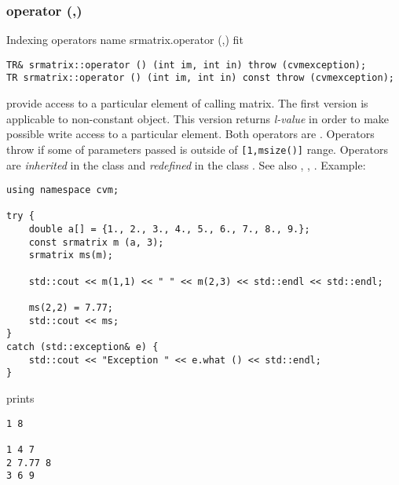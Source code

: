\subsubsection{operator (,)}
Indexing operators%
\pdfdest name {srmatrix.operator (,)} fit
\begin{verbatim}
TR& srmatrix::operator () (int im, int in) throw (cvmexception);
TR srmatrix::operator () (int im, int in) const throw (cvmexception);
\end{verbatim}
provide access to a particular element of calling matrix. The first version
is applicable to non-constant object.
This version returns  \emph{l-value}
in order to make possible write access to a particular element.
Both operators are \Based.
Operators throw 
if some of parameters passed
is outside of \verb"[1,msize()]" range.
Operators are \emph{inherited}
in the class
and \emph{redefined}
in the class .
See also ,
,
.
Example:
\begin{Verbatim}
using namespace cvm;

try {
    double a[] = {1., 2., 3., 4., 5., 6., 7., 8., 9.};
    const srmatrix m (a, 3);
    srmatrix ms(m);

    std::cout << m(1,1) << " " << m(2,3) << std::endl << std::endl;

    ms(2,2) = 7.77;
    std::cout << ms;
}
catch (std::exception& e) {
    std::cout << "Exception " << e.what () << std::endl;
}
\end{Verbatim}
prints
\begin{Verbatim}
1 8

1 4 7
2 7.77 8
3 6 9
\end{Verbatim}
\newpage


